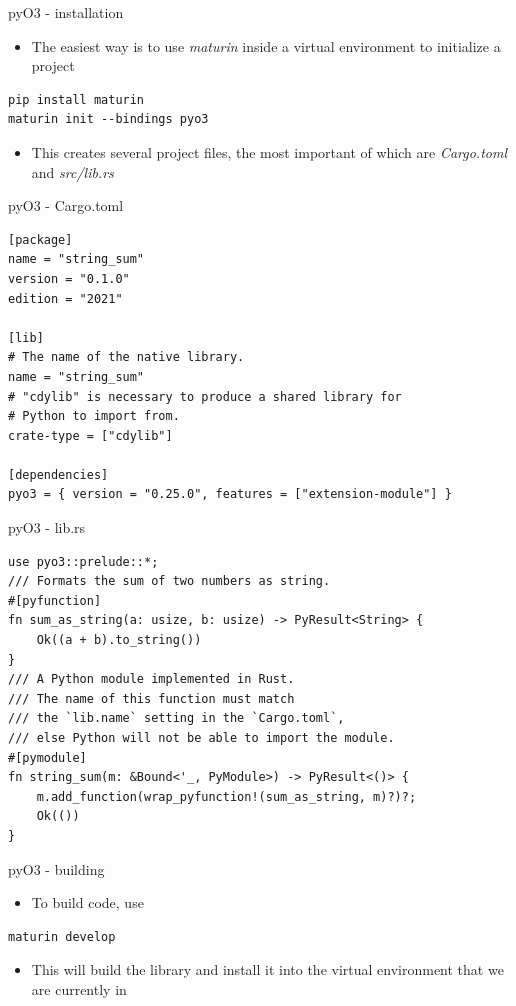 \documentclass[presentation]{beamer}
\begin{document}
\begin{frame}[label=pyo3---installation,fragile]{pyO3 - installation}
 \begin{itemize}
\item The easiest way is to use \alert{\emph{maturin}} inside a virtual environment to
initialize a project
\end{itemize}

\begin{verbatim}
pip install maturin
maturin init --bindings pyo3
\end{verbatim}

\begin{itemize}
\item This creates several project files, the most important of which are
\alert{\emph{Cargo.toml}} and \alert{\emph{src/lib.rs}}
\end{itemize}
\end{frame}
\begin{frame}[label=pyo3---cargo.toml,fragile]{pyO3 - Cargo.toml}
 \begin{verbatim}
[package]
name = "string_sum"
version = "0.1.0"
edition = "2021"

[lib]
# The name of the native library.
name = "string_sum"
# "cdylib" is necessary to produce a shared library for
# Python to import from.
crate-type = ["cdylib"]

[dependencies]
pyo3 = { version = "0.25.0", features = ["extension-module"] }
\end{verbatim}
\end{frame}
\begin{frame}[label=pyo3---lib.rs,fragile]{pyO3 - lib.rs}
 \begin{verbatim}
use pyo3::prelude::*;
/// Formats the sum of two numbers as string.
#[pyfunction]
fn sum_as_string(a: usize, b: usize) -> PyResult<String> {
    Ok((a + b).to_string())
}
/// A Python module implemented in Rust.
/// The name of this function must match
/// the `lib.name` setting in the `Cargo.toml`,
/// else Python will not be able to import the module.
#[pymodule]
fn string_sum(m: &Bound<'_, PyModule>) -> PyResult<()> {
    m.add_function(wrap_pyfunction!(sum_as_string, m)?)?;
    Ok(())
}
\end{verbatim}
\end{frame}
\begin{frame}[label=pyo3---building,fragile]{pyO3 - building}
 \begin{itemize}
\item To build code, use
\end{itemize}

\begin{verbatim}
maturin develop
\end{verbatim}

\begin{itemize}
\item This will build the library and install it into the virtual
environment that we are currently in
\end{itemize}
\end{frame}
\end{document}
